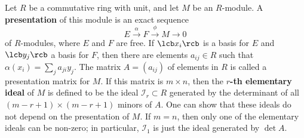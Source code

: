 Let $R$ be a commutative ring with unit, and let $M$ be an $R$-module. A \textbf{presentation} of this module is an exact sequence
\[ E \stackrel{\alpha}{\longrightarrow} F \stackrel{\phi}{\longrightarrow} M \longrightarrow 0 \]
of $R$-modules, where $E$ and $F$ are free. If $\lcb x_i \rcb$ is a basis for $E$ and $\lcb y_j \rcb$ a basis for $F$, then there are elements $a_{ij} \in R$ such that $\alpha(x_i) = \sum_j a_{ji} y_j$. The matrix $A = (a_{ij})$ of elements in $R$ is called a presentation matrix for $M$. If this matrix is $m \times n$, then the \textbf{$r$-th elementary ideal} of $M$ is defined to be the ideal $\mathcal I_r \subset R$ generated by the determinant of all $(m-r+1) \times (m-r+1)$ minors of $A$. One can show that these ideals do not depend on the presentation of $M$. If $m=n$, then only one of the elementary ideals can be non-zero; in particular, $\mathcal I_1$ is just the ideal generated by $\det A$.

